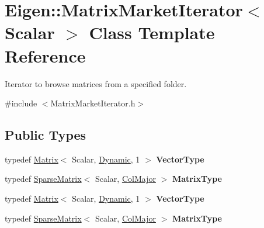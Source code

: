 \hypertarget{class_eigen_1_1_matrix_market_iterator}{}\section{Eigen\+:\+:Matrix\+Market\+Iterator$<$ Scalar $>$ Class Template Reference}
\label{class_eigen_1_1_matrix_market_iterator}


Iterator to browse matrices from a specified folder.  




{\ttfamily \#include $<$Matrix\+Market\+Iterator.\+h$>$}

\subsection*{Public Types}
\begin{DoxyCompactItemize}
\item 
\mbox{\label{class_eigen_1_1_matrix_market_iterator_a9ede23117c49cb584b98b153e48a7579}} 
typedef \hyperlink{group___core___module_class_eigen_1_1_matrix}{Matrix}$<$ Scalar, \hyperlink{namespace_eigen_ad81fa7195215a0ce30017dfac309f0b2}{Dynamic}, 1 $>$ {\bfseries Vector\+Type}
\item 
\mbox{\label{class_eigen_1_1_matrix_market_iterator_a93d63563ecdf91f82a1b0ed8956049c4}} 
typedef \hyperlink{group___sparse_core___module_class_eigen_1_1_sparse_matrix}{Sparse\+Matrix}$<$ Scalar, \hyperlink{group__enums_ggaacded1a18ae58b0f554751f6cdf9eb13a0cbd4bdd0abcfc0224c5fcb5e4f6669a}{Col\+Major} $>$ {\bfseries Matrix\+Type}
\item 
\mbox{\label{class_eigen_1_1_matrix_market_iterator_a9ede23117c49cb584b98b153e48a7579}} 
typedef \hyperlink{group___core___module_class_eigen_1_1_matrix}{Matrix}$<$ Scalar, \hyperlink{namespace_eigen_ad81fa7195215a0ce30017dfac309f0b2}{Dynamic}, 1 $>$ {\bfseries Vector\+Type}
\item 
\mbox{\label{class_eigen_1_1_matrix_market_iterator_a93d63563ecdf91f82a1b0ed8956049c4}} 
typedef \hyperlink{group___sparse_core___module_class_eigen_1_1_sparse_matrix}{Sparse\+Matrix}$<$ Scalar, \hyperlink{group__enums_ggaacded1a18ae58b0f554751f6cdf9eb13a0cbd4bdd0abcfc0224c5fcb5e4f6669a}{Col\+Major} $>$ {\bfseries Matrix\+Type}
\end{DoxyCompactItemize}
